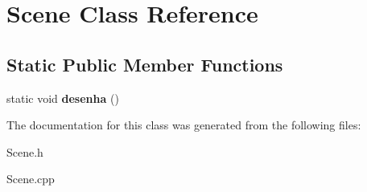 \hypertarget{classScene}{\section{\-Scene \-Class \-Reference}
\label{classScene}
}
\subsection*{\-Static \-Public \-Member \-Functions}
\begin{DoxyCompactItemize}
\item 
\hypertarget{classScene_a78bb9749731c6a464fbdea98a3371877}{static void {\bfseries desenha} ()}\label{classScene_a78bb9749731c6a464fbdea98a3371877}

\end{DoxyCompactItemize}


\-The documentation for this class was generated from the following files\-:\begin{DoxyCompactItemize}
\item 
\-Scene.\-h\item 
\-Scene.\-cpp\end{DoxyCompactItemize}
